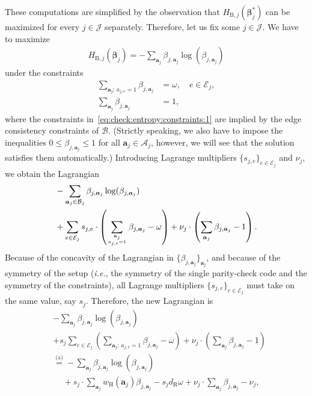 \documentclass[journal, twocolumn]{IEEEtran}
\renewcommand{\mathbf}[1]{{\bm{#1}}}
\newcommand{\ie}{\emph{i.e.}}
\renewcommand{\leq}{\leqslant}
\newcommand{\vect}[1]{\mathbf{#1}}
\newcommand{\set}[1]{\mathcal{#1}}
\newcommand{\onestareq}{\overset{\text{(a)}}{=}}
\newcommand{\bel}{\beta}
\newcommand{\vbel}{\boldsymbol{\bel}}
\newcommand{\vbels}{\boldsymbol{\bel}^{*}}
\newcommand{\setA}{\set{A}}
\newcommand{\setE}{\set{E}}
\newcommand{\setJ}{\set{J}}
\newcommand{\va}{\vect{a}}
\newcommand{\dright}{d_{\mathrm{R}}}
\newcommand{\wH}{w_{\mathrm{H}}}
\newcommand{\lmpB}{\mathcal{B}}
\newcommand{\HBethesub}[1]{H_{\mathrm{B},#1}}
\newcommand{\?}{\mathrm{?}}
\begin{document}
These computations are simplified by the observation that
$\HBethesub{j}(\vbels_j)$ can be maximized for every $j \in \setJ$
separately. Therefore, let us fix some $j \in \setJ$. We have to maximize
\begin{align}
  \HBethesub{j}(\vbel_j)
    = -
      \sum_{\va_j}
        \bel_{j,\va_j} \log(\bel_{j,\va_j})
          \label{eq:check:entropy:1}
\end{align}
under the constraints 
\begin{align}
  \sum_{\va_j: \, a_{j,e} = 1}
    \bel_{j,\va_j}
    &= \omega,
       \quad e \in \set{E}_j,
         \label{eq:check:entropy:constraints:1} \\
  \sum_{\va_j} \bel_{j,\va_j}
    &= 1,
         \label{eq:check:entropy:constraints:2}
\end{align}
where the constraints in~\eqref{eq:check:entropy:constraints:1} are implied by
the edge consistency constraints of $\lmpB$. (Strictly speaking, we also have
to impose the inequalities $0 \leq \bel_{j,\va_j} \leq 1$ for all $\va_j \in
\setA_j$, however, we will see that the solution satisfies them
automatically.) Introducing Lagrange multipliers $\{ s_{j,e} \}_{e \in
  \setE_j}$ and $\nu_j$, we obtain the Lagrangian
\begin{align*}
  &
  -
  \sum_{\va_j \in \set{B}_j}
    \bel_{j,\va_j} \log(\bel_{j,\va_j}) \\
  &
  +
  \sum_{e \in \set{E}_j}
    s_{j,e}
    \cdot
    \left(
      \sum_{\va_j \atop a_{j,e} = 1}
        \bel_{j,\va_j}
      -
      \omega
    \right)
  +
  \nu_j
    \cdot
    \left(
      \sum_{\va_j} \bel_{j,\va_j}
      -
      1
    \right).
\end{align*}
Because of the concavity of the Lagrangian in $\{ \bel_{j,\va_j} \}_{\va_j}$,
and because of the symmetry of the setup (\ie, the symmetry of the single
parity-check code and the symmetry of the constraints), all Lagrange
multipliers $\{ s_{j,e} \}_{e \in \setE_j}$ must take on the same value, say
$s_j$. Therefore, the new Lagrangian is
\begin{align*}
  &
  -
  \sum_{\va_j}
    \bel_{j,\va_j} \log(\bel_{j,\va_j}) \\
  &
  +
  s_j
  \sum_{e \in \set{E}_j}
    \left(
      \sum_{\va_j: \, a_{j,e} = 1}
      \bel_{j,\va_j}
      -
      \omega
    \right)
    +
    \nu_j
    \cdot
    \left(
      \sum_{\va_j} \bel_{j,\va_j}
      -
      1
    \right) \\
    &\onestareq
       - \!
       \sum_{\va_j}
         \bel_{j,\va_j} \! \log(\bel_{j,\va_j}) \\
    &\quad\,
       +
       s_j
         \cdot
         \sum_{\va_j}
           \wH(\va_j)
           \bel_{j,\va_j}
       - 
       s_j \dright \omega
       +
       \nu_j
         \cdot
         \sum_{\va_j}
           \bel_{j,\va_j}
       -
       \nu_j,
\end{align*}
\end{document}
